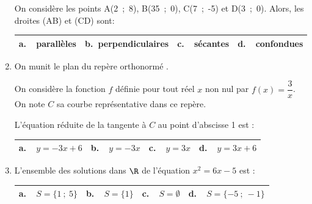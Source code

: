\begin{enumerate}
On considère les points A(2~;~8), B(35~;~0), C(7~;~-5) et D(3~;~0). Alors, les droites (AB) et (CD) sont:

\begin{center}
\begin{tabularx}{\linewidth}{|*{4}{X|}}\hline
\textbf{a.~~}parallèles&\textbf{b.~}perpendiculaires&\textbf{c.~~}sécantes&\textbf{d.~~}confondues\\ \hline
\end{tabularx}
\end{center}

\item On munit le plan du repère orthonormé \Oij.

On considère la fonction $f$ définie pour tout réel $x$ non nul par $f(x) = \dfrac{3}{x}$. On note $C$ sa courbe représentative dans ce repère. 

L'équation réduite de la tangente à $C$ au point d'abscisse 1 est :

\begin{center}
\begin{tabularx}{\linewidth}{|*{4}{X|}}\hline
\textbf{a.~~}$y = -3x + 6$ &\textbf{b.~~}$y = -3x$&\textbf{c.~~}$ y = 3x$  &
\textbf{d.~~}$y = 3x + 6$\\ \hline
\end{tabularx}
\end{center}

\item L'ensemble des solutions dans $\R$ de l'équation $x^2 = 6x - 5$ est :

\begin{center}
\begin{tabularx}{\linewidth}{|*{4}{X|}}\hline
\textbf{a.~~}$S =\{1~;~5\}$ &\textbf{b.~~}$S = \{1\}$&\textbf{c.~~}$S = \emptyset$  &\textbf{d.~~}$S = \{- 5~;~-1\}$\\ \hline
\end{tabularx}
\end{center}
\end{enumerate}

\bigskip
